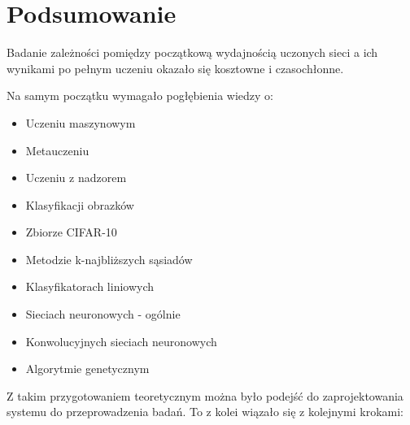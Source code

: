 \chapter{Podsumowanie}\label{chap:summary}

Badanie zależności pomiędzy początkową wydajnością uczonych sieci a ich wynikami po pełnym uczeniu okazało się kosztowne i czasochłonne.

Na samym początku wymagało pogłębienia wiedzy o:

\begin{itemize}
  \item Uczeniu maszynowym
  \item Metauczeniu
  \item Uczeniu z nadzorem
  \item Klasyfikacji obrazków
  \item Zbiorze CIFAR-10
  \item Metodzie k-najbliższych sąsiadów
  \item Klasyfikatorach liniowych
  \item Sieciach neuronowych - ogólnie
  \item Konwolucyjnych sieciach neuronowych
  \item Algorytmie genetycznym
\end{itemize}

Z takim przygotowaniem teoretycznym można było podejść do zaprojektowania systemu do przeprowadzenia badań.
To z kolei wiązało się z kolejnymi krokami:

